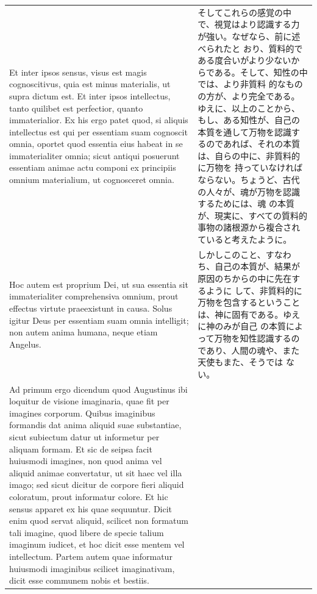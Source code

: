 \documentclass[paper=a4paper,fontsize=10pt,jafontsize=9pt,titlepage]{jlreq}
\begin{document}
\begin{longtable}{p{21em}p{21em}}
Et inter ipsos sensus, visus est magis cognoscitivus, quia est minus materialis,
ut supra dictum est. Et inter ipsos intellectus, tanto quilibet est perfectior,
quanto immaterialior. Ex his ergo patet quod, si aliquis intellectus est qui per
essentiam suam cognoscit omnia, oportet quod essentia eius habeat in se
immaterialiter omnia; sicut antiqui posuerunt essentiam animae actu componi ex
principiis omnium materialium, ut cognosceret omnia.

&

そしてこれらの感覚の中で、視覚はより認識する力が強い。なぜなら、前に述べられたと
おり、質料的である度合いがより少ないからである。そして、知性の中では、より非質料
的なものの方が、より完全である。ゆえに、以上のことから、もし、ある知性が、自己の
本質を通して万物を認識するのであれば、それの本質は、自らの中に、非質料的に万物を
持っていなければならない。ちょうど、古代の人々が、魂が万物を認識するためには、魂
の本質が、現実に、すべての質料的事物の諸根源から複合されていると考えたように。
 
\\[1em]

Hoc autem est proprium Dei, ut sua essentia sit immaterialiter comprehensiva omnium, prout effectus virtute praeexistunt in causa. Solus igitur Deus per essentiam suam omnia intelligit; non autem anima humana, neque etiam Angelus.

&

 しかしこのこと、すなわち、自己の本質が、結果が原因のちからの中に先在するように
 して、非質料的に万物を包含するということは、神に固有である。ゆえに神のみが自己
 の本質によって万物を知性認識するのであり、人間の魂や、また天使もまた、そうでは
 ない。


\\[1em]

Ad primum ergo dicendum quod Augustinus ibi loquitur de visione imaginaria, quae
fit per imagines corporum. Quibus imaginibus formandis dat anima aliquid suae
substantiae, sicut subiectum datur ut informetur per aliquam formam. Et sic de
seipsa facit huiusmodi imagines, non quod anima vel aliquid animae convertatur,
ut sit haec vel illa imago; sed sicut dicitur de corpore fieri aliquid
coloratum, prout informatur colore. Et hic sensus apparet ex his quae
sequuntur. Dicit enim quod servat aliquid, scilicet non formatum tali imagine,
quod libere de specie talium imaginum iudicet, et hoc dicit esse mentem vel
intellectum. Partem autem quae informatur huiusmodi imaginibus scilicet
imaginativam, dicit esse communem nobis et bestiis.


\end{longtable}
\end{document}
